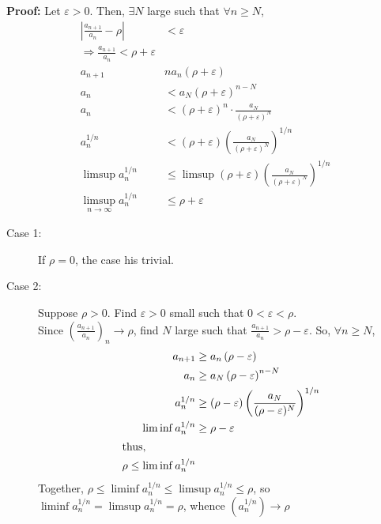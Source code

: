 \documentclass[10pt]{extarticle}
\begin{document}
    \textbf{Proof:} Let $\varepsilon > 0$. Then, $\exists N$ large such that $\forall n\geq N$,
    \begin{align*}
      \left|\frac{a_{n+1}}{a_n} - \rho\right| &< \varepsilon\tag*{$\forall n\geq N$}\\
      \Rightarrow \frac{a_{n+1}}{a_n} < \rho + \varepsilon\tag*{$\forall n\geq N$}\\
      a_{n+1} &n a_n\left(\rho + \varepsilon\right)\tag*{$\forall n\geq N$}\\
      a_{n} &< a_N \left(\rho + \varepsilon\right)^{n-N}\tag*{$\forall n \geq N$}\\
      a_n &< \left(\rho + \varepsilon\right)^{n}\cdot \frac{a_N}{\left(\rho + \varepsilon\right)^N}\\
      a_n^{1/n} &< \left(\rho + \varepsilon\right) \left(\frac{a_N}{\left(\rho + \varepsilon\right)^N}\right)^{1/n}\\
      \limsup a_n^{1/n}&\leq \limsup \left(\rho + \varepsilon\right) \left(\frac{a_N}{\left(\rho + \varepsilon\right)^N}\right)^{1/n}\\
      \limsup_{n\rightarrow\infty} a_n^{1/n} &\leq \rho + \varepsilon
    \end{align*}
    \begin{description}
      \item[Case 1:] If $\rho = 0$, the case his trivial.
      \item[Case 2:] Suppose $\rho > 0$. Find $\varepsilon > 0$ small such that $0 < \varepsilon < \rho$.\\

        Since $\left(\frac{a_{n+1}}{a_n}\right)_n\rightarrow \rho$, find $N$ large such that $\frac{a_{n+1}}{a_n} > \rho - \varepsilon$. So, $\forall n \geq N$,
        \begin{align*}
          a_{n+1} &\geq a_n\left(\rho-\varepsilon\right)\\
          a_n &\geq a_{N}\left(\rho - \varepsilon\right)^{n-N}\\
          a_n^{1/n} &\geq \left(\rho - \varepsilon\right) \left(\frac{a_N}{(\rho - \varepsilon)^{N}}\right)^{1/n}\\
          \liminf a_n^{1/n} &\geq \rho - \varepsilon\\
          \shortintertext{thus,}
          \rho \leq \liminf a_n^{1/n}
        \end{align*}
        Together, $\rho \leq \liminf a_n^{1/n} \leq \limsup a_n^{1/n} \leq \rho$, so $\liminf a_n^{1/n} = \limsup a_n^{1/n} = \rho$, whence $\left(a_n^{1/n}\right) \rightarrow \rho$
    \end{description}
\end{document}
